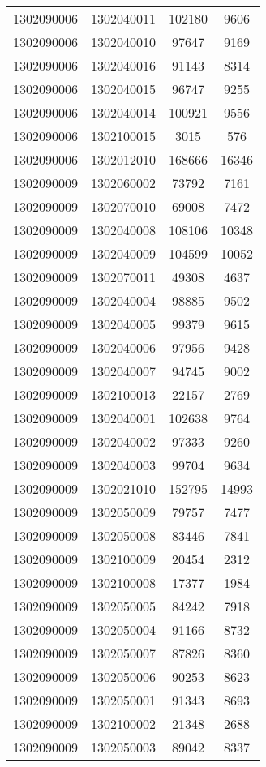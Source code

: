 \begin{longtable}[h]{llcc}
		1302090006 & 1302040011 & 102180 & 9606\\
		1302090006 & 1302040010 & 97647 & 9169\\
		1302090006 & 1302040016 & 91143 & 8314\\
		1302090006 & 1302040015 & 96747 & 9255\\
		1302090006 & 1302040014 & 100921 & 9556\\
		1302090006 & 1302100015 & 3015 & 576\\
		1302090006 & 1302012010 & 168666 & 16346\\
		1302090009 & 1302060002 & 73792 & 7161\\
		1302090009 & 1302070010 & 69008 & 7472\\
		1302090009 & 1302040008 & 108106 & 10348\\
		1302090009 & 1302040009 & 104599 & 10052\\
		1302090009 & 1302070011 & 49308 & 4637\\
		1302090009 & 1302040004 & 98885 & 9502\\
		1302090009 & 1302040005 & 99379 & 9615\\
		1302090009 & 1302040006 & 97956 & 9428\\
		1302090009 & 1302040007 & 94745 & 9002\\
		1302090009 & 1302100013 & 22157 & 2769\\
		1302090009 & 1302040001 & 102638 & 9764\\
		1302090009 & 1302040002 & 97333 & 9260\\
		1302090009 & 1302040003 & 99704 & 9634\\
		1302090009 & 1302021010 & 152795 & 14993\\
		1302090009 & 1302050009 & 79757 & 7477\\
		1302090009 & 1302050008 & 83446 & 7841\\
		1302090009 & 1302100009 & 20454 & 2312\\
		1302090009 & 1302100008 & 17377 & 1984\\
		1302090009 & 1302050005 & 84242 & 7918\\
		1302090009 & 1302050004 & 91166 & 8732\\
		1302090009 & 1302050007 & 87826 & 8360\\
		1302090009 & 1302050006 & 90253 & 8623\\
		1302090009 & 1302050001 & 91343 & 8693\\
		1302090009 & 1302100002 & 21348 & 2688\\
		1302090009 & 1302050003 & 89042 & 8337\\

\end{longtable}

